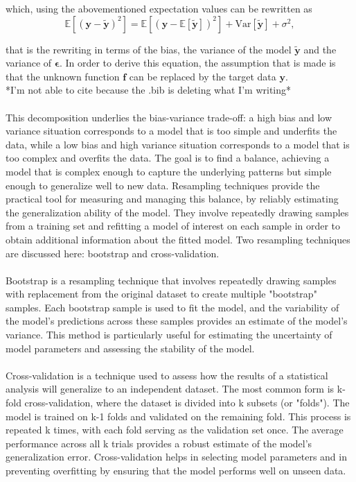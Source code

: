 \documentclass[
 reprint,            %
 amsmath,amssymb,
 aps,
]{revtex4-2}
\begin{document}
which, using the abovementioned expectation values can be rewritten as
$$
\mathbb{E}\left[(\boldsymbol{y}-\boldsymbol{\tilde{y}})^2\right]=\mathbb{E}\left[(\boldsymbol{y}-\mathbb{E}\left[\boldsymbol{\tilde{y}}\right])^2\right]+\mathrm{Var}\left[\boldsymbol{\tilde{y}}\right]+\sigma^2,
$$

that is the rewriting in terms of the bias, the variance of the model $\boldsymbol{\tilde{y}}$ and the variance of $\boldsymbol{\epsilon}$. \cite{misc} 
In order to derive this equation, the assumption that is made is that the unknown function $\boldsymbol{f}$ can be replaced by the target data $\boldsymbol{y}$.\\
*I'm not able to cite because the .bib is deleting what I'm writing* \\\\ 
This decomposition underlies the bias-variance trade-off: a high bias and low variance situation corresponds to a model that is too simple and underfits the data, while a low bias and high variance situation corresponds to a model that is too complex and overfits the data.
The goal is to find a balance, achieving a model that is complex enough to capture the underlying patterns but simple enough to generalize well to new data.
Resampling techniques provide the practical tool for measuring and managing this balance, by reliably estimating the generalization ability of the model.
They involve repeatedly drawing samples from a training set and refitting a model of interest on each sample in order to obtain additional information about the fitted model. Two resampling techniques are discussed here: bootstrap and cross-validation.\\\\
Bootstrap is a resampling technique that involves repeatedly drawing samples with replacement from the original dataset to create multiple "bootstrap" samples. Each bootstrap sample is used to fit the model, and the variability of the model's predictions across these samples provides an estimate of the model's variance. This method is particularly useful for estimating the uncertainty of model parameters and assessing the stability of the model.\\\\
Cross-validation is a technique used to assess how the results of a statistical analysis will generalize to an independent dataset. The most common form is k-fold cross-validation, where the dataset is divided into k subsets (or "folds"). The model is trained on k-1 folds and validated on the remaining fold. This process is repeated k times, with each fold serving as the validation set once. The average performance across all k trials provides a robust estimate of the model's generalization error. Cross-validation helps in selecting model parameters and in preventing overfitting by ensuring that the model performs well on unseen data.\\\\
\end{document}
